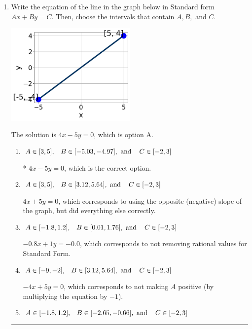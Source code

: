\documentclass{extbook}[14pt]
\newcommand{\litem}[1]{\item #1

\rule{\textwidth}{0.4pt}}
\begin{document}
\begin{enumerate}\litem{
Write the equation of the line in the graph below in Standard form $Ax+By=C$. Then, choose the intervals that contain $A, B, \text{ and } C$.

\begin{center}
    \includegraphics[width=0.5\textwidth]{../Figures/linearGraphToStandardB.png}
\end{center}


The solution is \( 4x - 5y = 0 \), which is option A.\begin{enumerate}[label=\Alph*.]
\item \( A \in [3, 5], \hspace{3mm} B \in [-5.03, -4.97], \text{ and } \hspace{3mm} C \in [-2, 3] \)

* $4x - 5y = 0$, which is the correct option.
\item \( A \in [3, 5], \hspace{3mm} B \in [3.12, 5.64], \text{ and } \hspace{3mm} C \in [-2, 3] \)

 $4x + 5y = 0$, which corresponds to using the opposite (negative) slope of the graph, but did everything else correctly.
\item \( A \in [-1.8, 1.2], \hspace{3mm} B \in [0.01, 1.76], \text{ and } \hspace{3mm} C \in [-2, 3] \)

 $-0.8x + 1y = -0.0$, which corresponds to not removing rational values for Standard Form.
\item \( A \in [-9, -2], \hspace{3mm} B \in [3.12, 5.64], \text{ and } \hspace{3mm} C \in [-2, 3] \)

 $-4x + 5y = 0$, which corresponds to not making $A$ positive (by multiplying the equation by $-1$).
\item \( A \in [-1.8, 1.2], \hspace{3mm} B \in [-2.65, -0.66], \text{ and } \hspace{3mm} C \in [-2, 3] \)


\end{enumerate}}
\end{enumerate}
\end{document}
